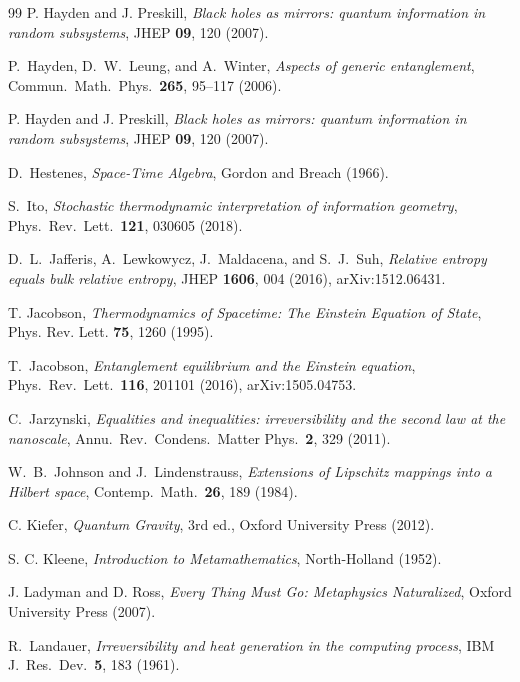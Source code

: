 \documentclass[12pt,a4paper,openany]{book}
\begin{document}
\begin{thebibliography}{99}
P. Hayden and J. Preskill, \emph{Black holes as mirrors: quantum information in random subsystems}, JHEP \textbf{09}, 120 (2007).

P.~Hayden, D.~W.~Leung, and A.~Winter,
\emph{Aspects of generic entanglement},
Commun.\ Math.\ Phys.\ \textbf{265}, 95--117 (2006).

P. Hayden and J. Preskill, \emph{Black holes as mirrors: quantum information in random subsystems}, JHEP \textbf{09}, 120 (2007).

D.~Hestenes, \emph{Space-Time Algebra}, Gordon and Breach (1966).

S.~Ito,
\emph{Stochastic thermodynamic interpretation of
information geometry},
Phys.\ Rev.\ Lett.\ \textbf{121}, 030605 (2018).

D.~L.~Jafferis, A.~Lewkowycz, J.~Maldacena, and S.~J.~Suh,
\emph{Relative entropy equals bulk relative entropy},
JHEP \textbf{1606}, 004 (2016),
arXiv:1512.06431.

T. Jacobson, \emph{Thermodynamics of Spacetime: The Einstein Equation of State}, Phys. Rev. Lett. \textbf{75}, 1260 (1995).

T.~Jacobson,
\emph{Entanglement equilibrium and the Einstein equation},
Phys.\ Rev.\ Lett.\ \textbf{116}, 201101 (2016),
arXiv:1505.04753.

C.~Jarzynski, \emph{Equalities and inequalities: irreversibility and the second law at the nanoscale}, Annu.\ Rev.\ Condens.\ Matter Phys.\ \textbf{2}, 329 (2011).

W.~B.~Johnson and J.~Lindenstrauss,
\emph{Extensions of Lipschitz mappings into a Hilbert space},
Contemp.\ Math.\ \textbf{26}, 189 (1984).

C. Kiefer, \emph{Quantum Gravity}, 3rd ed., Oxford University Press (2012).

S. C. Kleene, \emph{Introduction to Metamathematics}, North-Holland (1952).

J. Ladyman and D. Ross, \emph{Every Thing Must Go: Metaphysics Naturalized}, Oxford University Press (2007).

R.~Landauer,
\emph{Irreversibility and heat generation in the computing process},
IBM J.\ Res.\ Dev.\ \textbf{5}, 183 (1961).


\end{thebibliography}
\end{document}
